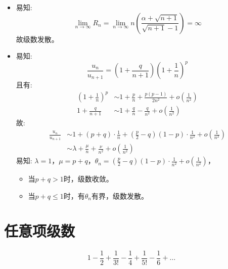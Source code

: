 \begin{solution}
    \begin{itemize}
        \item 易知: \[
                \lim_{n \to \infty} R_{n}=\lim_{n \to \infty} n\left(
                    \frac{\alpha+\sqrt{n+1}}{\sqrt{n+1}-1}
                \right)= \infty
            \]
            故级数发散。
        \item 易知: \[
                \frac{u_{n}}{u_{n+1}}= \left(
                1+\frac{q}{n+1} \right)\left(
                1+\frac{1}{n} \right)^{p}
            \]
            且有:
            \begin{align}
                \left( 1+\frac{1}{n} \right)^{p} & \sim 1+
                \frac{p}{n}+
                \frac{p(p-1)}{2n^{2}} + o(\frac{1}{n^{2}})
                \\
                1 + \frac{q}{n+1}                & \sim
                1+\frac{q}{n}-\frac{q}{n^{2}}+o(\frac{1}{n^{2}})
            \end{align}
            故:
            \begin{align*}
                \frac{u_{n}}{u_{n+1}} & \sim  1+(p+q)\cdot
                \frac{1}{n}+\left(
                \frac{p}{2}-q \right)\left( 1-p\right) \cdot
                \frac{1}{n^{2}}+o(\frac{1}{n^{2}})
                \\
                & \sim \lambda + \frac{\mu}{n} + \frac{\nu}{n^{2}} +
                o(\frac{1}{n^{2}})
            \end{align*}
            易知: \(\lambda = 1\)，\(\mu = p+q\)，\(\theta_{n} =
                \left(\frac{p}{2}-q
                \right)\left(
            1-p\right)\cdot\frac{1}{n^{2}}+o(\frac{1}{n^{2}})\)，

            \begin{itemize}
                \item 当\(p+q > 1\)时，级数收敛。
                \item 当\(p+q \le 1\)时，有\(\theta_n\)有界，级数发散。
            \end{itemize}
    \end{itemize}

\end{solution}
\section{任意项级数}
\[
    1 - \frac{1}{2} + \frac{1}{3!} - \frac{1}{4} + \frac{1}{5!} -
    \frac{1}{6} + \dots
\]

